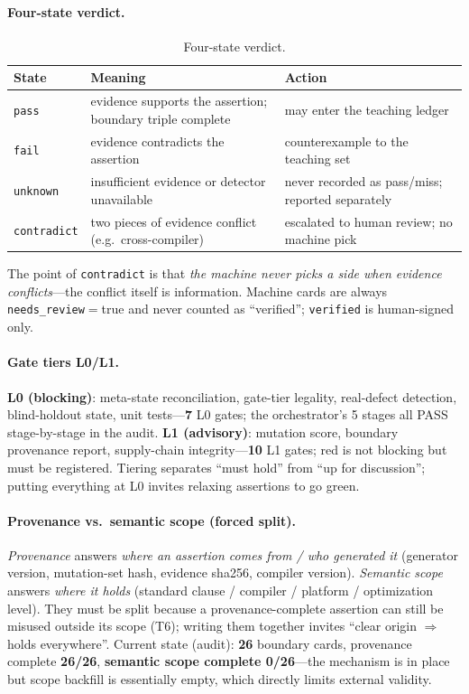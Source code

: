 \documentclass{article}
\begin{document}
\paragraph{Four-state verdict.}
\begin{table}[t]
\caption{Four-state verdict.}
\label{tab:verdict}
\centering
\small
\begin{tabular}{@{}lll@{}}
\toprule
State & Meaning & Action \\
\midrule
\texttt{pass} & evidence supports the assertion; boundary triple complete & may enter the teaching ledger \\
\texttt{fail} & evidence contradicts the assertion & counterexample to the teaching set \\
\texttt{unknown} & insufficient evidence or detector unavailable & never recorded as pass/miss; reported separately \\
\texttt{contradict} & two pieces of evidence conflict (e.g.\ cross-compiler) & escalated to human review; no machine pick \\
\bottomrule
\end{tabular}
\end{table}
The point of \texttt{contradict} is that \emph{the machine never picks a side when evidence
conflicts}---the conflict itself is information. Machine cards are always
\texttt{needs\_review}$=$true and never counted as ``verified''; \texttt{verified} is
human-signed only.

\paragraph{Gate tiers L0/L1.} \textbf{L0 (blocking)}: meta-state reconciliation, gate-tier
legality, real-defect detection, blind-holdout state, unit tests---\textbf{7} L0 gates; the
orchestrator's 5 stages all PASS stage-by-stage in the audit. \textbf{L1 (advisory)}: mutation
score, boundary provenance report, supply-chain integrity---\textbf{10} L1 gates; red is not
blocking but must be registered. Tiering separates ``must hold'' from ``up for discussion'';
putting everything at L0 invites relaxing assertions to go green.

\paragraph{Provenance vs.\ semantic scope (forced split).}
\label{sec:prov}
\emph{Provenance} answers \emph{where an assertion comes from / who generated it} (generator
version, mutation-set hash, evidence sha256, compiler version). \emph{Semantic scope} answers
\emph{where it holds} (standard clause / compiler / platform / optimization level). They must be
split because a provenance-complete assertion can still be misused outside its scope (T6); writing
them together invites ``clear origin $\Rightarrow$ holds everywhere''. Current state (audit):
\textbf{26} boundary cards, provenance complete \textbf{26/26}, \textbf{semantic scope complete
0/26}---the mechanism is in place but scope backfill is essentially empty, which directly limits
external validity.
\end{document}
